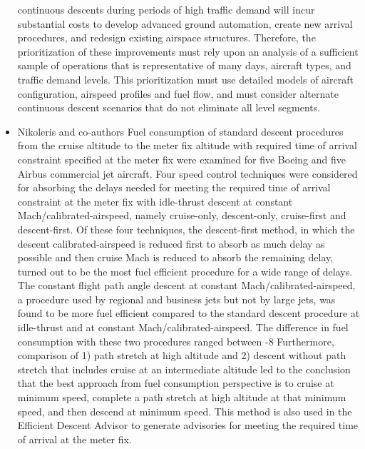\documentclass{aer1315-pretty}
\begin{document}
\begin{itemize}
continuous descents during periods of high traffic demand will incur substantial costs to develop advanced ground
automation, create new arrival procedures, and redesign existing airspace structures. Therefore, the prioritization of
these improvements must rely upon an analysis of a sufficient sample of operations that is representative of many
days, aircraft types, and traffic demand levels. This prioritization must use detailed models of aircraft configuration,
airspeed profiles and fuel flow, and must consider alternate continuous descent scenarios that do not eliminate all
level segments.



\item Nikoleris and co-authors \cite{Niko:2012} 
    Fuel consumption of standard descent procedures from the cruise altitude to the meter fix altitude with required
time of arrival constraint specified at the meter fix were examined for five Boeing and five Airbus commercial jet
aircraft. Four speed control techniques were considered for absorbing the delays needed for meeting the required
time of arrival constraint at the meter fix with idle-thrust descent at constant Mach/calibrated-airspeed, namely
cruise-only, descent-only, cruise-first and descent-first. Of these four techniques, the descent-first method, in which
the descent calibrated-airspeed is reduced first to absorb as much delay as possible and then cruise Mach is reduced
to absorb the remaining delay, turned out to be the most fuel efficient procedure for a wide range of delays.
    The constant flight path angle descent at constant Mach/calibrated-airspeed, a procedure used by regional and
business jets but not by large jets, was found to be more fuel efficient compared to the standard descent procedure at
idle-thrust and at constant Mach/calibrated-airspeed. The difference in fuel consumption with these two procedures
ranged between -8%
    Furthermore, comparison of 1) path stretch at high altitude and 2) descent without path stretch that includes
cruise at an intermediate altitude led to the conclusion that the best approach from fuel consumption perspective is to
cruise at minimum speed, complete a path stretch at high altitude at that minimum speed, and then descend at
minimum speed. This method is also used in the Efficient Descent Advisor to generate advisories for meeting the
required time of arrival at the meter fix.




\end{itemize}
\end{document}
